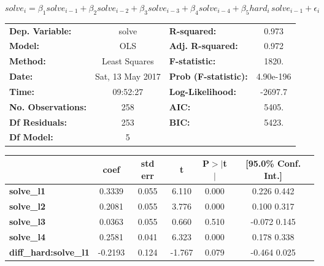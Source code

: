 \documentclass{article}
\begin{document}
\[
solve_i = \beta_1 solve_{i-1} + \beta_2 solve_{i-2} + \beta_3 solve_{i-3} + \beta_4 solve_{i-4} + \beta_5 hard_i \, solve_{i-1} + \epsilon_i
\]

\begin{center}
\begin{tabular}{lclc}
\toprule
\textbf{Dep. Variable:}     &      solve       & \textbf{  R-squared:         } &     0.973   \\
\textbf{Model:}             &       OLS        & \textbf{  Adj. R-squared:    } &     0.972   \\
\textbf{Method:}            &  Least Squares   & \textbf{  F-statistic:       } &     1820.   \\
\textbf{Date:}              & Sat, 13 May 2017 & \textbf{  Prob (F-statistic):} & 4.90e-196   \\
\textbf{Time:}              &     09:52:27     & \textbf{  Log-Likelihood:    } &   -2697.7   \\
\textbf{No. Observations:}  &         258      & \textbf{  AIC:               } &     5405.   \\
\textbf{Df Residuals:}      &         253      & \textbf{  BIC:               } &     5423.   \\
\textbf{Df Model:}          &           5      & \textbf{                     } &             \\
\bottomrule
\end{tabular}
\begin{tabular}{lccccc}
                            & \textbf{coef} & \textbf{std err} & \textbf{t} & \textbf{P$>$$|$t$|$} & \textbf{[95.0\% Conf. Int.]}  \\
\midrule
\textbf{solve\_l1}           &       0.3339  &        0.055     &     6.110  &         0.000        &         0.226     0.442       \\
\textbf{solve\_l2}           &       0.2081  &        0.055     &     3.776  &         0.000        &         0.100     0.317       \\
\textbf{solve\_l3}           &       0.0363  &        0.055     &     0.660  &         0.510        &        -0.072     0.145       \\
\textbf{solve\_l4}           &       0.2581  &        0.041     &     6.323  &         0.000        &         0.178     0.338       \\
\textbf{diff\_hard:solve\_l1} &      -0.2193  &        0.124     &    -1.767  &         0.079        &        -0.464     0.025       \\
\bottomrule

\end{tabular}
\end{center}
\end{document}

